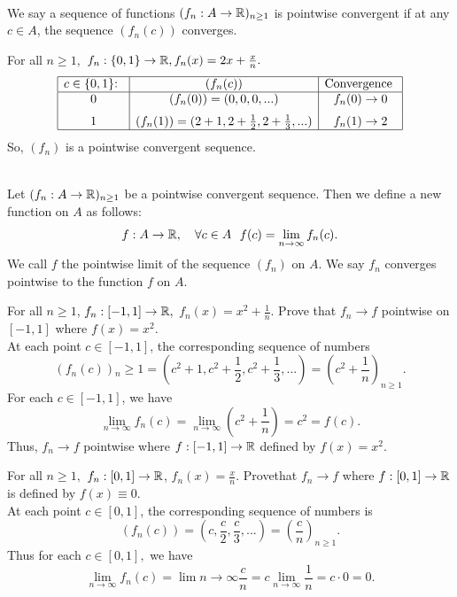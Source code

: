 \begin{definition} \leavevmode \\
    We say a sequence of functions $(f_n: A \to \mathbb{R})_{n \geq 1}$ is pointwise convergent if at any $c \in A$, the sequence $(f_n(c))$ converges.
\end{definition}

\begin{example}
    For all $n \geq 1,$ $f_n : \left\{0,1\right\} \to \mathbb{R}, f_n(x) = 2x+\frac{x}{n}.$
    \[
    \begin{array}{|c|c|c|}
        \hline
        \text{$c \in \left\{0,1\right\}$: } & (f_n(c)) & \text{Convergence }\\
        \hline
        0 & (f_n(0)) = (0,0,0,...) & f_n(0) \to 0 \\[6pt]
        1 & (f_n(1)) = (2+1, 2+\frac{1}{2}, 2+ \frac{1}{3}, ...) & f_n(1) \to 2\\
        \hline
    \end{array}
    \]
    So, $(f_n)$ is a pointwise convergent sequence.
\end{example}

\begin{definition} \leavevmode \\
    Let $(f_n: A \to \mathbb{R})_{n \geq 1}$ be a pointwise convergent sequence. Then we define a new function on $A$ as follows:
    $$f:A \to \mathbb{R}, ~~~\forall c \in A ~~f(c) = \lim_{n\to \infty}f_n(c).$$
    We call $f$ the pointwise limit of the sequence $(f_n)$ on $A$. We say $f_n$ converges pointwise to the function $f$ on $A$.
\end{definition}

\begin{example}
    For all $n \geq 1$, $f_n:[-1,1] \to \mathbb{R},$ $f_n(x) = x^2 + \frac{1}{n}.$ Prove that $f_n \to f$ pointwise on $[-1,1]$ where $f(x) = x^2.$ \\
    At each point $c \in [-1,1]$, the corresponding sequence of numbers
    $$(f_n(c)){_n\geq 1} = (c^2+1,c^2+\frac{1}{2},c^2+\frac{1}{3}, ...) = (c^2+\frac{1}{n})_{n\geq 1}.$$
    For each $c \in [-1,1]$, we have
    $$\lim_{n\to \infty}f_n(c) = \lim_{n\to \infty}\left(c^2 + \frac{1}{n}\right) = c^2 = f(c).$$
    Thus, $f_n \to f$ pointwise where $f: [-1,1] \to \mathbb{R}$ defined by $f(x) = x^2$.
\end{example}

\begin{example}
    For all $n\geq 1,$ $f_n:[0,1] \to \mathbb{R}$, $f_n(x) = \frac{x}{n}.$ Provethat $f_n \to f$ where $f:[0,1] \to \mathbb{R}$ is defined by $f(x) \equiv 0$. \\
    At each point $c \in [0,1]$, the corresponding sequence of numbers is
    $$(f_n(c)) = \left(c, \frac{c}{2}, \frac{c}{3}, ...\right) = \left(\frac{c}{n}\right)_{n\geq 1}.$$
    Thus for each $c \in [0,1],$ we have
    $$\lim_{n \to \infty} f_n(c) = \lim{n \to \infty}\frac{c}{n} = c \lim_{n\to \infty}\frac{1}{n} = c\cdot 0 = 0.$$
\end{example}

